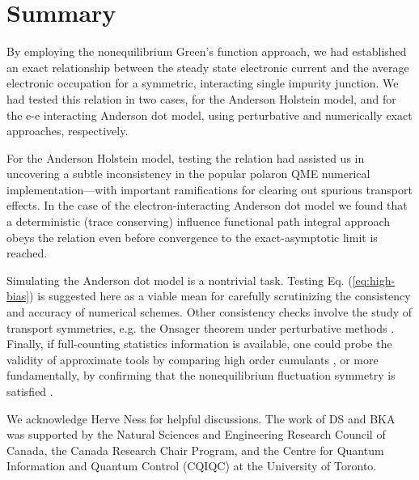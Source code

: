 \documentclass[aps,pra,twocolumn,groupedaddress,showpacs,superscriptaddress,amssymb,amsmath]{revtex4-1}
\begin{document}

\section{Summary}
\label{Ssum}

By employing the nonequilibrium Green's function approach, we 
had established an exact relationship between the steady state electronic current 
and the average electronic occupation for a symmetric, interacting single impurity junction. 
We had tested this relation in two cases, for the Anderson Holstein model, and for the e-e interacting Anderson dot model,
using perturbative and numerically exact approaches, respectively. 
 
For the Anderson Holstein model, testing the relation had assisted us in uncovering a subtle inconsistency in the
popular polaron QME numerical implementation---with important ramifications for clearing out spurious transport effects.
In the case of the electron-interacting Anderson dot model we found that a deterministic (trace conserving)
influence functional path integral approach obeys the relation
even before convergence to the exact-asymptotic limit is reached. 

Simulating the Anderson dot model is a nontrivial task. 
Testing Eq. (\ref{eq:high-bias}) is suggested here as a viable mean for carefully scrutinizing
the consistency and accuracy of numerical schemes. 
Other consistency checks involve the study of transport symmetries, e.g. the  Onsager theorem under
perturbative methods \cite{Wacker}.
Finally, if full-counting statistics information is available,
one could probe the validity of approximate tools 
by comparing high order cumulants \cite{bijay-recon}, 
or more fundamentally, by confirming that the nonequilibrium fluctuation symmetry is satisfied \cite{bijay-vibration}.


We acknowledge Herve Ness for helpful discussions.
The work of DS and BKA was supported by the Natural Sciences and Engineering Research Council of Canada, 
the Canada Research Chair Program, 
and the Centre for Quantum Information and Quantum Control (CQIQC) at the University of Toronto.

\end{document}
